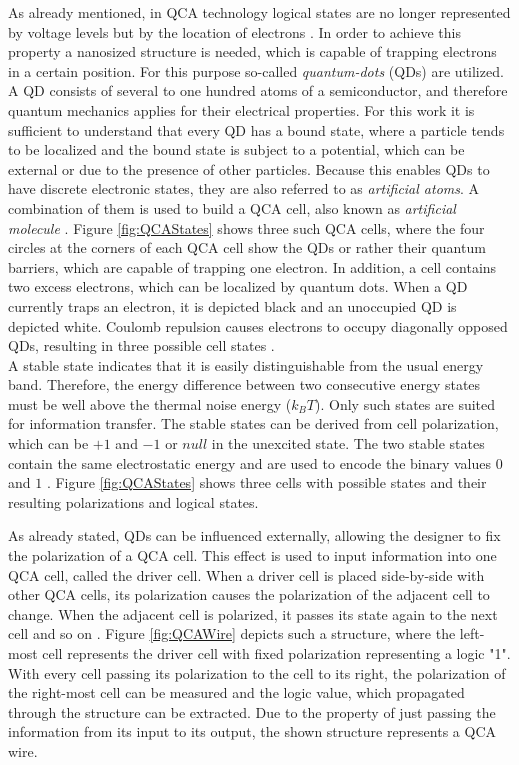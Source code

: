 As already mentioned, in QCA technology logical states are no longer represented by voltage levels but by the location of electrons \cite{QCA_technology}. In order to achieve this property a nanosized structure is needed, which is capable of trapping electrons in a certain position. For this purpose so-called \textit{quantum-dots} (QDs) are utilized. A QD consists of several to one hundred
atoms of a semiconductor, and therefore quantum mechanics applies for their electrical properties. For this work it is sufficient to understand that every QD has a bound state, where a particle tends to be localized and the bound state is subject to a potential, which can be external or due to the presence of other particles. Because this enables QDs to have discrete electronic states, they are also referred to as \textit{artificial atoms}. A combination of them is used to build a QCA cell, also known as \textit{artificial molecule} \cite{Quantum_dots}. Figure \ref{fig:QCAStates} shows three such QCA cells, where the four circles at the corners of each QCA cell show the QDs or rather their quantum barriers, which are capable of trapping one electron. In addition, a cell contains two excess electrons, which can be localized by quantum dots. When a QD currently traps an electron, it is depicted black and an unoccupied QD is depicted white. Coulomb repulsion causes electrons to occupy diagonally opposed QDs, resulting in three possible cell states \cite{Sasamal2020QuantumDotCA, lent1997device, lent1994quantum}.\\
A stable state indicates that it is easily distinguishable from the usual energy band. Therefore, the energy difference between two consecutive energy states must be well above the thermal noise energy ($k_BT$). Only such states are suited for information transfer. The stable states can be derived from cell polarization, which can be $+1$ and $-1$ or $null$ in the unexcited state. The two stable states contain the same electrostatic energy and are used to encode the binary values $0$ and $1$ \cite{Sasamal2020QuantumDotCA}. Figure \ref{fig:QCAStates} shows three cells with possible states and their resulting polarizations and logical states.

As already stated, QDs can be influenced externally, allowing the designer to fix the polarization of a QCA cell. This effect is used to input information into one QCA cell, called the driver cell. When a driver cell is placed side-by-side with other QCA cells, its polarization causes the polarization of the adjacent cell to change. When the adjacent cell is polarized, it passes its state again to the next cell and so on \cite{lent1997device}. Figure \ref{fig:QCAWire} depicts such a structure, where the left-most cell represents the driver cell with fixed polarization representing a logic "1". With every cell passing its polarization to the cell to its right, the polarization of the right-most cell can be measured and the logic value, which propagated through the structure can be extracted. Due to the property of just passing the information from its input to its output, the shown structure represents a QCA wire.

